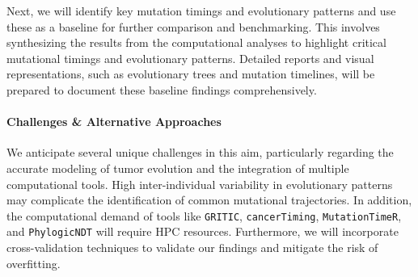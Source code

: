 Next, we will identify key mutation timings and evolutionary patterns and use these as a baseline for further comparison and benchmarking. 
This involves synthesizing the results from the computational analyses to highlight critical mutational timings and evolutionary patterns. 
Detailed reports and visual representations, such as evolutionary trees and mutation timelines, 
will be prepared to document these baseline findings comprehensively.

\paragraph{Challenges \& Alternative Approaches}

We anticipate several unique challenges in this aim, particularly regarding the accurate modeling of 
tumor evolution and the integration of multiple computational tools. 
High inter-individual variability in evolutionary patterns may complicate the identification of common mutational trajectories. 
In addition, the computational demand of tools like 
\texttt{GRITIC}, \texttt{cancerTiming}, \texttt{MutationTimeR}, and \texttt{PhylogicNDT} 
will require HPC resources.
Furthermore, we will incorporate cross-validation techniques to validate our findings and mitigate the risk of overfitting. 
